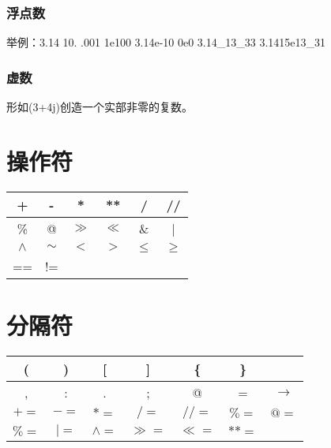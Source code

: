\documentclass[10pt,UTF8]{ctexart}
\begin{document}
\subsubsection{浮点数}
举例：3.14 10. .001 1e100 3.14e-10 0e0 3.14\_13\_33 3.1415e13\_31
\subsubsection{虚数}
形如(3+4j)创造一个实部非零的复数。

\section{操作符}
\begin{center}
\begin{tabular}{cccccc}
\hline 
+ & - & * & ** & / & // \\ 
\hline 
\% & @ & $\gg$ & $\ll$ & \& & | \\ 
\hline 
$\wedge$ & $\sim$ & $<$ & $>$ & $\le$ & $\ge$ \\
\hline 
== & !=  \\ 
\hline 
\end{tabular} 
\end{center}
\section{分隔符}
\begin{center}
\begin{tabular}{ccccccc}
\hline 
( & ) & [ & ] & \{ & \} &  \\ 
\hline 
, & : & . & ; & @ & = & $\rightarrow$ \\ 
\hline 
$+=$ & $-=$ & $*=$ & $/=$ & $//=$ & $\%=$ & $@=$ \\ 
\hline 
$\%=$ & $|=$ & $\wedge=$ & $\gg=$ & $\ll=$ & $**=$ &  \\ 
\hline 
\end{tabular}
\end{center}
\end{document}

